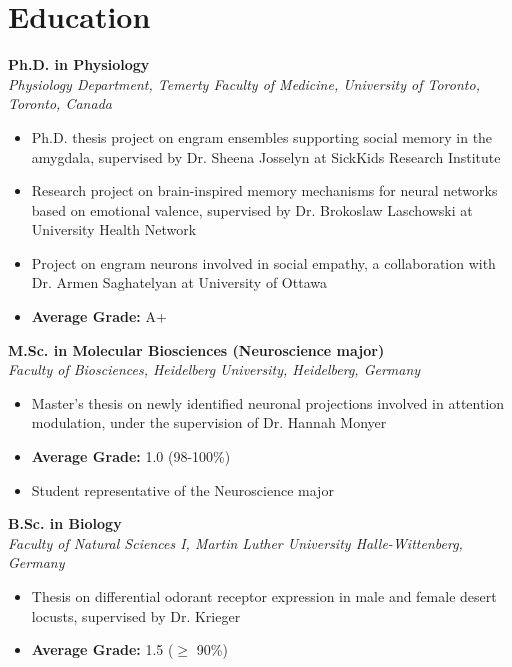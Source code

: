 \documentclass[12pt]{article}
\begin{document}
\section*{Education}
\begin{description}[labelwidth=5em, labelsep=1em, leftmargin=1em, itemsep=8pt]
    \item[\textbf{2023/09 -- ongoing}] \textbf{Ph.D. in Physiology} \\ 
    \textit{Physiology Department, Temerty Faculty of Medicine, University of Toronto, Toronto, Canada}  
    \begin{itemize}
        \item Ph.D. thesis project on engram ensembles supporting social memory in the amygdala, supervised by Dr. Sheena Josselyn at SickKids Research Institute
        \item Research project on brain-inspired memory mechanisms for neural networks based on emotional valence, supervised by Dr. Brokoslaw Laschowski at University Health Network
        \item Project on engram neurons involved in social empathy, a collaboration with Dr. Armen Saghatelyan at University of Ottawa
        \item \textbf{Average Grade:} A+
    \end{itemize}

    \item[\textbf{2021/10 -- 2023/09}] \textbf{M.Sc. in Molecular Biosciences (Neuroscience major)} \\ 
    \textit{Faculty of Biosciences, Heidelberg University, Heidelberg, Germany}  
    \begin{itemize}
        \item Master's thesis on newly identified neuronal projections involved in attention modulation, under the supervision of Dr. Hannah Monyer
        \item \textbf{Average Grade:} 1.0 (98-100\%)
        \item Student representative of the Neuroscience major
    \end{itemize}

    \item[\textbf{2018/10 -- 2021/09}] \textbf{B.Sc. in Biology} \\
    \textit{Faculty of Natural Sciences I, Martin Luther University Halle-Wittenberg, Germany}  
    \begin{itemize}
        \item Thesis on differential odorant receptor expression in male and female desert locusts, supervised by Dr. Krieger
        \item \textbf{Average Grade:} 1.5 ($\geq$ 90\%)
    \end{itemize}
\end{description}
\end{document}

